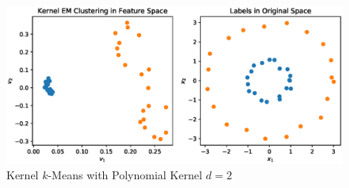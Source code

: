 \documentclass{article}[12pt]
\begin{document}
\begin{figure}[h]
	\centering
	\includegraphics[width=0.8\linewidth]{./img/polynomial_2.eps}
	\caption{Kernel $k$-Means with Polynomial Kernel $d=2$}%
	\label{fig:poly}
\end{figure}
\end{document}
